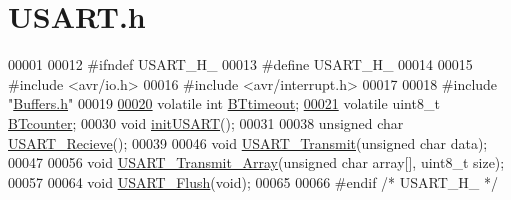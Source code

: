 \hypertarget{_u_s_a_r_t_8h_source}{}\section{U\+S\+A\+R\+T.\+h}
\label{_u_s_a_r_t_8h_source}

\begin{DoxyCode}
00001 
00012 \textcolor{preprocessor}{#ifndef USART\_H\_}
00013 \textcolor{preprocessor}{#define USART\_H\_}
00014 
00015 \textcolor{preprocessor}{#include <avr/io.h>}
00016 \textcolor{preprocessor}{#include <avr/interrupt.h>}
00017 
00018 \textcolor{preprocessor}{#include "\hyperlink{_buffers_8h}{Buffers.h}"}
00019 
\hypertarget{_u_s_a_r_t_8h_source.tex_l00020}{}\hyperlink{_u_s_a_r_t_8h_ac73ad3c207657516f4f319adaf861a1b}{00020} \textcolor{keyword}{volatile} \textcolor{keywordtype}{int} \hyperlink{_u_s_a_r_t_8h_ac73ad3c207657516f4f319adaf861a1b}{BTtimeout}; 
\hypertarget{_u_s_a_r_t_8h_source.tex_l00021}{}\hyperlink{_u_s_a_r_t_8h_ad9497e6b45d71841b52db55c1ef891f6}{00021} \textcolor{keyword}{volatile} uint8\_t \hyperlink{_u_s_a_r_t_8h_ad9497e6b45d71841b52db55c1ef891f6}{BTcounter}; 
00030 \textcolor{keywordtype}{void} \hyperlink{_u_s_a_r_t_8h_a4b46e2e6b871d0b0f138e61760b10fa2}{initUSART}();
00031 
00038 \textcolor{keywordtype}{unsigned} \textcolor{keywordtype}{char} \hyperlink{_u_s_a_r_t_8h_aec32185dd8feec99d38acc7f8ab69197}{USART\_Recieve}();
00039 
00046 \textcolor{keywordtype}{void} \hyperlink{_u_s_a_r_t_8h_ab8c416106cf1aff4ccdb3da4860fc179}{USART\_Transmit}(\textcolor{keywordtype}{unsigned} \textcolor{keywordtype}{char} data);
00047 
00056 \textcolor{keywordtype}{void} \hyperlink{_u_s_a_r_t_8h_a03b0ffa896b87d880101195bf1377df9}{USART\_Transmit\_Array}(\textcolor{keywordtype}{unsigned} \textcolor{keywordtype}{char} array[], uint8\_t size);
00057 
00064 \textcolor{keywordtype}{void} \hyperlink{_u_s_a_r_t_8h_a0f33ec0995bf5f267e847d9e22fb596a}{USART\_Flush}(\textcolor{keywordtype}{void});
00065 
00066 \textcolor{preprocessor}{#endif }\textcolor{comment}{/* USART\_H\_ */}\textcolor{preprocessor}{}
\end{DoxyCode}
